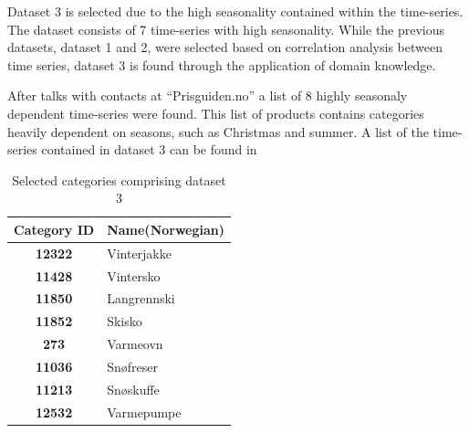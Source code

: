 Dataset 3 is selected due to the high seasonality contained within the time-series.
The dataset consists of 7 time-series with high seasonality.
While the previous datasets, dataset 1 and 2, were selected based on correlation analysis between time series,
dataset 3 is found through the application of domain knowledge.

After talks with contacts at ``Prisguiden.no'' a list of 8 highly seasonaly dependent time-series were found.
This list of products contains categories heavily dependent on seasons, such as Christmas and summer.
A list of the time-series contained in dataset 3 can be found in 


\begin{table}[H]
  \centering
  \caption{Selected categories comprising dataset 3}
  \label{table:dataset3}
  \begin{tabular}{|c|l|}\hline
    Category ID      & Name(Norwegian) \\ \hline
    \textbf{12322  } & Vinterjakke     \\ \hline
    \textbf{11428  } & Vintersko       \\ \hline
    \textbf{11850  } & Langrennski     \\ \hline
    \textbf{11852  } & Skisko          \\ \hline
    \textbf{273    } & Varmeovn        \\ \hline
    \textbf{11036  } & Snøfreser       \\ \hline
    \textbf{11213  } & Snøskuffe       \\ \hline
    \textbf{12532  } & Varmepumpe      \\ \hline
  \end{tabular}
\end{table}


